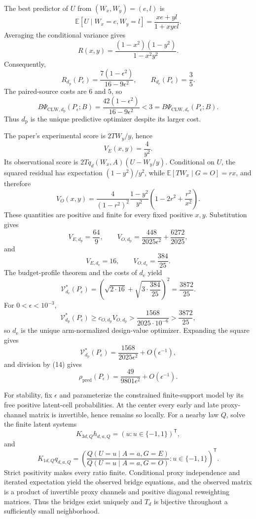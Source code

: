 The best predictor of \(U\) from \((W_x,W_y)=(e,l)\) is
\[
 \mathbb E[U\mid W_x=e,W_y=l]
 =\frac{xe+yl}{1+xyel}.
\]
Averaging the conditional variance gives
\[
 R(x,y)=\frac{(1-x^2)(1-y^2)}{1-x^2y^2}. \tag{7}
\]
Consequently,
\[
 R_{d_{\mathrm p}}(P_\epsilon)
 =\frac{7(1-\epsilon^2)}{16-9\epsilon^2},
 \qquad
 R_{d_{\mathrm e}}(P_\epsilon)=\frac35. \tag{8}
\]
The paired-source costs are \(6\) and \(5\), so
\[
 B\Psi_{\mathrm{CLW},d_{\mathrm p}}(P_\epsilon;B)
 =\frac{42(1-\epsilon^2)}{16-9\epsilon^2}
 <3
 =B\Psi_{\mathrm{CLW},d_{\mathrm e}}(P_\epsilon;B). \tag{9}
\]
Thus \(d_{\mathrm p}\) is the unique predictive optimizer despite its larger cost.

The paper's experimental score is \(2TW_y/y\), hence
\[
 V_E(x,y)=\frac4{y^2}. \tag{10}
\]
Its observational score is \(2Tq_d(W_x,A)(U-W_y/y)\). Conditional on \(U\), the squared residual has expectation \((1-y^2)/y^2\), while \(\mathbb E[TW_x\mid G=O]=rx\), and therefore
\[
 V_O(x,y)=
 \frac4{(1-r^2)^2}\frac{1-y^2}{y^2}
 \left(1-2r^2+\frac{r^2}{x^2}\right). \tag{11}
\]
These quantities are positive and finite for every fixed positive \(x,y\). Substitution gives
\[
 V_{E,d_{\mathrm p}}=\frac{64}{9},
 \qquad
 V_{O,d_{\mathrm p}}
 =\frac{448}{2025\epsilon^2}+\frac{6272}{2025}, \tag{12}
\]
and
\[
 V_{E,d_{\mathrm e}}=16,
 \qquad
 V_{O,d_{\mathrm e}}=\frac{384}{25}. \tag{13}
\]
The budget-profile theorem and the costs of \(d_{\mathrm e}\) yield
\[
 \mathcal V_{d_{\mathrm e}}^*(P_\epsilon)
 =\left(\sqrt{2\cdot16}+\sqrt{3\cdot\frac{384}{25}}\right)^2
 =\frac{3872}{25}. \tag{14}
\]
For \(0<\epsilon<10^{-3}\),
\[
 \mathcal V_{d_{\mathrm p}}^*(P_\epsilon)
 \ge c_{O,d_{\mathrm p}}V_{O,d_{\mathrm p}}
 >\frac{1568}{2025\cdot10^{-6}}
 >\frac{3872}{25}, \tag{15}
\]
so \(d_{\mathrm e}\) is the unique arm-normalized design-value optimizer. Expanding the square gives
\[
 \mathcal V_{d_{\mathrm p}}^*(P_\epsilon)
 =\frac{1568}{2025\epsilon^2}+O(\epsilon^{-1}),
\]
and division by (14) gives
\[
 \rho_{\mathrm{pred}}(P_\epsilon)
 =\frac{49}{9801\epsilon^2}+O(\epsilon^{-1}). \tag{16}
\]

For stability, fix \(\epsilon\) and parameterize the constrained finite-support model by its free positive latent-cell probabilities. At the center every early and late proxy-channel matrix is invertible, hence remains so locally. For a nearby law \(Q\), solve the finite latent systems
\[
 K_{3d,Q}h_{d,a,Q}=(u:u\in\{-1,1\})^{\mathsf T}, \tag{17}
\]
and
\[
 K_{1d,Q}q_{d,a,Q}
 =\left(
 \frac{Q(U=u\mid A=a,G=E)}{Q(U=u\mid A=a,G=O)}:
 u\in\{-1,1\}\right)^{\mathsf T}. \tag{18}
\]
Strict positivity makes every ratio finite. Conditional proxy independence and iterated expectation yield the observed bridge equations, and the observed matrix is a product of invertible proxy channels and positive diagonal reweighting matrices. Thus the bridges exist uniquely and \(T_d\) is bijective throughout a sufficiently small neighborhood.

